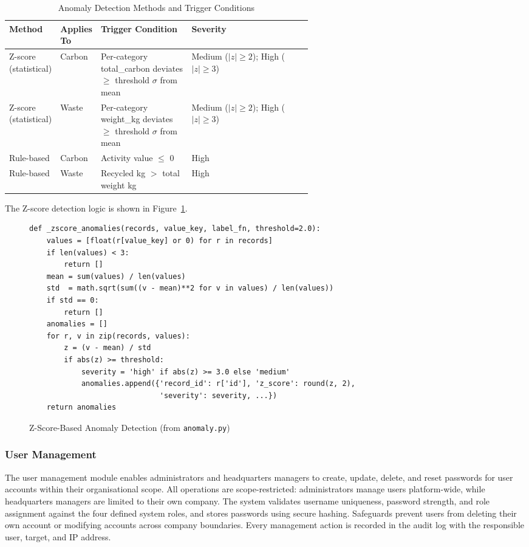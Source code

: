 \documentclass[11pt,a4paper]{article}
\begin{document}
\begin{table}[h]
\centering
\scriptsize
\begin{tabularx}{\linewidth}{@{}p{0.16\linewidth}p{0.12\linewidth}p{0.30\linewidth}X@{}}
\toprule
\textbf{Method} & \textbf{Applies To} & \textbf{Trigger Condition} & \textbf{Severity} \\
\midrule
Z-score (statistical) & Carbon & Per-category total\_carbon deviates $\geq$ threshold $\sigma$ from mean & Medium ($|z|\geq2$); High ($|z|\geq3$) \\
Z-score (statistical) & Waste & Per-category weight\_kg deviates $\geq$ threshold $\sigma$ from mean & Medium ($|z|\geq2$); High ($|z|\geq3$) \\
Rule-based & Carbon & Activity value $\leq$ 0 & High \\
Rule-based & Waste & Recycled kg $>$ total weight kg & High \\
\bottomrule
\end{tabularx}
\caption{Anomaly Detection Methods and Trigger Conditions}
\label{tab:anomaly}
\end{table}

The Z-score detection logic is shown in Figure~\ref{fig:zscore}.

\begin{figure}[h]
\begin{lstlisting}[style=pysnippet]
def _zscore_anomalies(records, value_key, label_fn, threshold=2.0):
    values = [float(r[value_key] or 0) for r in records]
    if len(values) < 3:
        return []
    mean = sum(values) / len(values)
    std  = math.sqrt(sum((v - mean)**2 for v in values) / len(values))
    if std == 0:
        return []
    anomalies = []
    for r, v in zip(records, values):
        z = (v - mean) / std
        if abs(z) >= threshold:
            severity = 'high' if abs(z) >= 3.0 else 'medium'
            anomalies.append({'record_id': r['id'], 'z_score': round(z, 2),
                              'severity': severity, ...})
    return anomalies
\end{lstlisting}
\caption{Z-Score-Based Anomaly Detection (from \texttt{anomaly.py})}
\label{fig:zscore}
\end{figure}

\subsubsection{User Management}
The user management module enables administrators and headquarters managers to create, update, delete, and reset passwords for user accounts within their organisational scope. All operations are scope-restricted: administrators manage users platform-wide, while headquarters managers are limited to their own company. The system validates username uniqueness, password strength, and role assignment against the four defined system roles, and stores passwords using secure hashing. Safeguards prevent users from deleting their own account or modifying accounts across company boundaries. Every management action is recorded in the audit log with the responsible user, target, and IP address.
\end{document}
